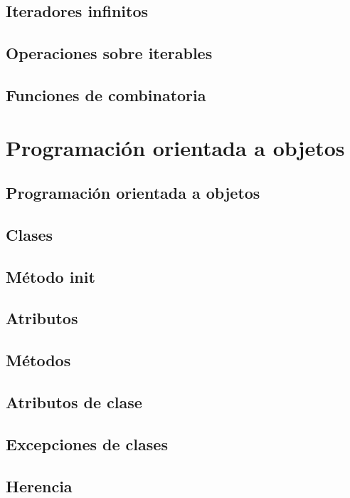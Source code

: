 \documentclass{article}
\begin{document}
\subsection{Iteradores infinitos}

\subsection{Operaciones sobre iterables}

\subsection{Funciones de combinatoria}

\newpage\section{Programación orientada a objetos}

\subsection{Programación orientada a objetos}

\subsection{Clases}

\subsection{Método init}

\subsection{Atributos}

\subsection{Métodos}

\subsection{Atributos de clase}

\subsection{Excepciones de clases}

\subsection{Herencia}
\end{document}
